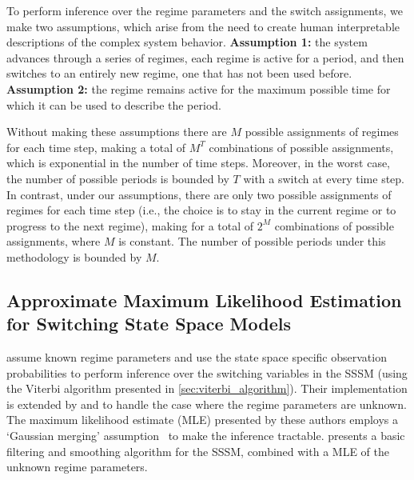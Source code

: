 To perform inference over the regime parameters and the switch assignments, we make two assumptions, which arise from the need to create human interpretable descriptions of the complex system behavior. \textbf{Assumption 1:} the system advances through a series of regimes, each regime is active for a period, and then switches to an entirely new regime, one that has not been used before. \textbf{Assumption 2:} the regime remains active for the maximum possible time for which it can be used to describe the period.

Without making these assumptions there are $M$ possible assignments of regimes for each time step, making a total of $M^T$ combinations of possible assignments, which is exponential in the number of time steps. Moreover, in the worst case, the number of possible periods is bounded by $T$ with a switch at every time step. In contrast, under our assumptions, there are only two possible assignments of regimes for each time step (i.e., the choice is to stay in the current regime or to progress to the next regime), making for a total of $2^M$ combinations of possible assignments, where $M$ is constant.  The number of possible periods under this methodology is bounded by $M$.

\subsection{Approximate Maximum Likelihood Estimation for Switching State Space Models}\label{sec:gaussian_merging}

\cite{shumway1991dynamic} assume known regime parameters and use the state space specific observation probabilities to perform inference over the switching variables in the SSSM (using the Viterbi algorithm presented in \ref{sec:viterbi_algorithm}). Their implementation is extended by \cite{kim1994dynamic, kim1999state} and \cite{bar1993estimation} to handle the case where the regime parameters are unknown. The maximum likelihood estimate (MLE) presented by these authors employs a `Gaussian merging' assumption~\citep{ghahramani2000variational} to make the inference tractable. \cite{kim1994dynamic} presents a basic filtering and smoothing algorithm for the SSSM, combined with a MLE of the unknown regime parameters.

